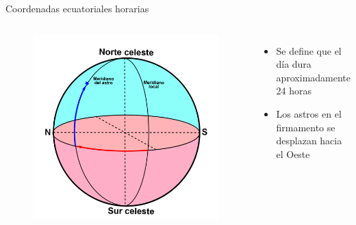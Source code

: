 \documentclass{beamer}
\begin{document}
\begin{frame}{Coordenadas ecuatoriales horarias}
 \begin{columns}
  \begin{figure}
   \centering
   \includegraphics[scale=0.14]{Imagenes/C_Ecua_horarias_01}
  \end{figure}
 \small
 \justify
\begin{itemize}
\item Se define que el día dura aproximadamente 24 horas
\item Los astros en el firmamento se desplazan hacia el Oeste
\end{itemize}
 \end{columns}
\end{frame}
\end{document}

